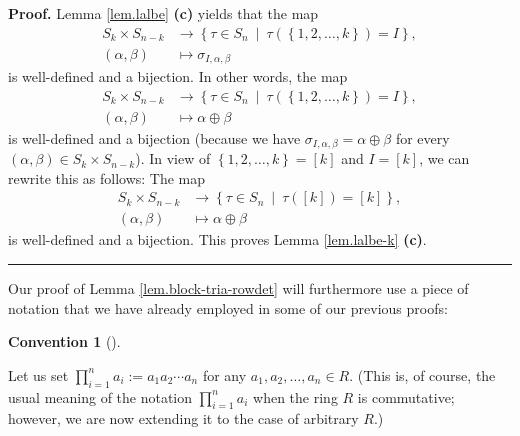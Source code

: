 \documentclass[numbers=enddot,12pt,final,onecolumn,notitlepage,english]{scrartcl}%
\theoremstyle{definition}
\newtheorem{conv}[theo]{Convention}
\newenvironment{convention}[1][]
{\begin{conv}[#1]\begin{leftbar}}
{\end{leftbar}\end{conv}}
\newenvironment{proof}[1][Proof]{\noindent\textbf{#1.} }{\ \rule{0.5em}{0.5em}}
\let\prodnonlimits\prod
\renewcommand{\prod}{\prodnonlimits\limits}
\newenvironment{verlong}{}{}
\begin{document}
\begin{verlong}
\begin{proof}
Lemma \ref{lem.lalbe} \textbf{(c)} yields that the map
\begin{align*}
S_{k}\times S_{n-k}  &  \rightarrow\left\{  \tau\in S_{n}\ \mid\ \tau\left(
\left\{  1,2,\ldots,k\right\}  \right)  =I\right\}  ,\\
\left(  \alpha,\beta\right)   &  \mapsto\sigma_{I,\alpha,\beta}%
\end{align*}
is well-defined and a bijection. In other words, the map%
\begin{align*}
S_{k}\times S_{n-k}  &  \rightarrow\left\{  \tau\in S_{n}\ \mid\ \tau\left(
\left\{  1,2,\ldots,k\right\}  \right)  =I\right\}  ,\\
\left(  \alpha,\beta\right)   &  \mapsto\alpha\oplus\beta
\end{align*}
is well-defined and a bijection (because we have $\sigma_{I,\alpha,\beta
}=\alpha\oplus\beta$ for every $\left(  \alpha,\beta\right)  \in S_{k}\times
S_{n-k}$). In view of $\left\{  1,2,\ldots,k\right\}  =\left[  k\right]  $ and
$I=\left[  k\right]  $, we can rewrite this as follows: The map%
\begin{align*}
S_{k}\times S_{n-k}  &  \rightarrow\left\{  \tau\in S_{n}\ \mid\ \tau\left(
\left[  k\right]  \right)  =\left[  k\right]  \right\}  ,\\
\left(  \alpha,\beta\right)   &  \mapsto\alpha\oplus\beta
\end{align*}
is well-defined and a bijection. This proves Lemma \ref{lem.lalbe-k}
\textbf{(c)}.
\end{proof}

Our proof of Lemma \ref{lem.block-tria-rowdet} will furthermore use a piece of
notation that we have already employed in some of our previous proofs:

\begin{convention}
\label{conv.prod-noncomm}Let us set $\prod_{i=1}^{n}a_{i}:=a_{1}a_{2}\cdots
a_{n}$ for any $a_{1},a_{2},\ldots,a_{n}\in R$. (This is, of course, the usual
meaning of the notation $\prod_{i=1}^{n}a_{i}$ when the ring $R$ is
commutative; however, we are now extending it to the case of arbitrary $R$.)
\end{convention}


\end{verlong}
\end{document}
